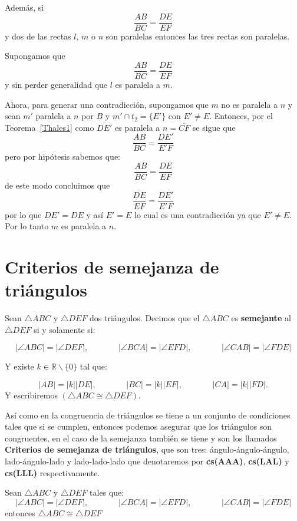 Además, si $$\frac{AB}{BC}=\frac{DE}{EF}$$ y dos de las rectas $l$, $m$ o $n$ son paralelas entonces las tres rectas son paralelas. 
			
\begin{dem}		
Supongamos que $$\frac{AB}{BC}=\frac{DE}{EF}$$ y sin perder generalidad que $l$ es paralela a $m$.

Ahora, para generar una contradicción, supongamos que $m$ no es paralela a $n$  y sean $m'$ paralela a $n$ por $B$  y $m'\cap t_{2}= \{E'\}$ con $E'\neq E$. Entonces, por el Teorema~\ref{Thales1} como $\overline{DE'}$ es paralela a $n= \overline{CF}$ se sigue que  $$\frac{AB}{BC}=\frac{DE'}{E'F}$$ pero por hipótesis sabemos que:  $$\frac{AB}{BC}=\frac{DE}{EF}$$ de este modo concluimos que  $$\frac{DE}{EF}=\frac{DE'}{E'F}$$ por lo que $DE'=DE$ y así $E'=E$ lo cual es una contradicción ya que $E'\neq E$. 
Por lo tanto $m$ es paralela a $n$. 
\end{dem}		
	
\section{Criterios de semejanza de triángulos}
\begin{df}\label{Semejanza df}
Sean $\triangle ABC$ y $\triangle DEF$ dos triángulos. Decimos que el $\triangle ABC$ es {\bf semejante} al $\triangle DEF$ si y solamente si:
	
$$|\angle ABC|=|\angle DEF|,  \;\;\;\;\;\;\;\;\;\;\;\;\; |\angle BCA|=|\angle EFD|,  \;\;\;\;\;\;\;\;\;\;\;\;\; |\angle CAB|=|\angle FDE|$$
	
Y existe $ k \in \mathbb{R} \backslash \{0\}$ tal que: 
	
$$|AB|=|k||DE|,  \;\;\;\;\;\;\;\;\;\;\;\;\; |BC|=|k||EF|,  \;\;\;\;\;\;\;\;\;\;\;\;\; |CA|=|k||FD|.$$
Y escribiremos $(\triangle ABC \cong \triangle DEF)$.
\end{df}
	
	
Así como en la congruencia de triángulos se tiene a un conjunto de condiciones tales que si se cumplen, entonces podemos asegurar que los triángulos son congruentes, en el caso de la semejanza también se tiene y son los llamados {\bf Criterios de semejanza de triángulos}, que son tres: ángulo-ángulo-ángulo, lado-ángulo-lado y lado-lado-lado que denotaremos por \textbf{cs(AAA)}, \textbf{cs(LAL)} y \textbf{cs(LLL)} respectivamente.

\begin{teo}
Sean $\triangle ABC$ y $\triangle DEF$ tales que: 
$$|\angle ABC|=|\angle DEF|,  \;\;\;\;\;\;\;\;\;\;\;\;\; |\angle BCA|=|\angle EFD|,  \;\;\;\;\;\;\;\;\;\;\;\;\; |\angle CAB|=|\angle FDE|$$
entonces $\triangle ABC \cong \triangle DEF$
\end{teo}
	

